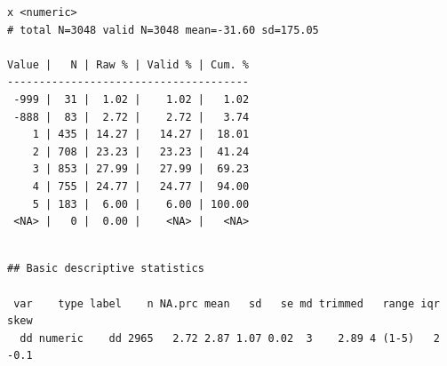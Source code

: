 \documentclass[
  letterpaper,
  DIV=11,
  numbers=noendperiod]{scrreprt}
\newenvironment{Shaded}{\begin{snugshade}}{\end{snugshade}}
\newcommand{\AttributeTok}[1]{\textcolor[rgb]{0.40,0.45,0.13}{#1}}
\newcommand{\CommentTok}[1]{\textcolor[rgb]{0.37,0.37,0.37}{#1}}
\newcommand{\ConstantTok}[1]{\textcolor[rgb]{0.56,0.35,0.01}{#1}}
\newcommand{\DecValTok}[1]{\textcolor[rgb]{0.68,0.00,0.00}{#1}}
\newcommand{\FunctionTok}[1]{\textcolor[rgb]{0.28,0.35,0.67}{#1}}
\newcommand{\NormalTok}[1]{\textcolor[rgb]{0.00,0.23,0.31}{#1}}
\newcommand{\OtherTok}[1]{\textcolor[rgb]{0.00,0.23,0.31}{#1}}
\newcommand{\SpecialCharTok}[1]{\textcolor[rgb]{0.37,0.37,0.37}{#1}}
\begin{document}
\begin{verbatim}
x <numeric> 
# total N=3048 valid N=3048 mean=-31.60 sd=175.05

Value |   N | Raw % | Valid % | Cum. %
--------------------------------------
 -999 |  31 |  1.02 |    1.02 |   1.02
 -888 |  83 |  2.72 |    2.72 |   3.74
    1 | 435 | 14.27 |   14.27 |  18.01
    2 | 708 | 23.23 |   23.23 |  41.24
    3 | 853 | 27.99 |   27.99 |  69.23
    4 | 755 | 24.77 |   24.77 |  94.00
    5 | 183 |  6.00 |    6.00 | 100.00
 <NA> |   0 |  0.00 |    <NA> |   <NA>
\end{verbatim}

\begin{Shaded}
\end{Shaded}

\begin{verbatim}

## Basic descriptive statistics

 var    type label    n NA.prc mean   sd   se md trimmed   range iqr skew
  dd numeric    dd 2965   2.72 2.87 1.07 0.02  3    2.89 4 (1-5)   2 -0.1
\end{verbatim}
\end{document}
